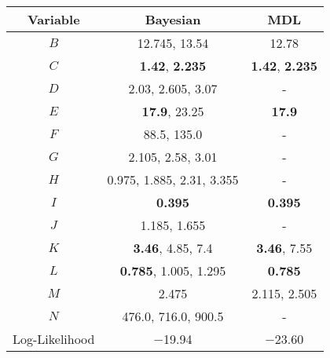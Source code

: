 \scriptsize
{}
\begin{tabular}{@{}ccc@{}}
\toprule
Variable & Bayesian            & MDL          \\
\midrule
$B$    & \num{12.745}, \num{13.54}                         & \num{12.78}        \\
$C$    & \textbf{\num{1.42}}, \textbf{\num{2.235}}                           & \textbf{\num{1.42}}, \textbf{\num{2.235}}  \\
$D$    & \num{2.03}, \num{2.605}, \num{3.07}               & -            \\
$E$    & \textbf{\num{17.9}}, \num{23.25}                           & \textbf{\num{17.9}}         \\
$F$    & \num{88.5}, \num{135.0}                           & -            \\
$G$    & \num{2.105}, \num{2.58}, \num{3.01}               & -            \\
$H$    & \num{0.975}, \num{1.885}, \num{2.31}, \num{3.355} & -            \\
$I$    & \textbf{\num{0.395}}                                       & \textbf{\num{0.395}}       \\
$J$    & \num{1.185}, \num{1.655}                          & -            \\
$K$    & \textbf{\num{3.46}}, \num{4.85}, \num{7.4}                 & \textbf{\num{3.46}}, \num{7.55}   \\
$L$    & \textbf{\num{0.785}}, \num{1.005}, 1.295                   & \textbf{\num{0.785}}        \\
$M$    & \num{2.475}                                       & \num{2.115}, \num{2.505} \\
$N$    & \num{476.0}, \num{716.0}, \num{900.5}             & -            \\
\midrule
Log-Likelihood   & \num{-19.94} & \num{-23.60}        \\
\bottomrule
\end{tabular}